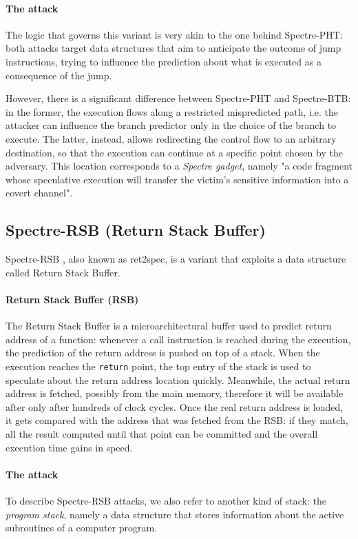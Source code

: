 \documentclass[12pt,a4paper]{book}
\theoremstyle{definition}
\begin{document}
	\paragraph{The attack} The logic that governs this variant is very akin to the one behind Spectre-PHT: both attacks target data structures that aim to anticipate the outcome of jump instructions, trying to influence the prediction about what is executed as a consequence of the jump.
	
	However, there is a significant difference between Spectre-PHT and Spectre-BTB: in the former, the execution flows along a restricted mispredicted path, i.e. the attacker can influence the branch predictor only in the choice of the branch to execute. The latter, instead, allows redirecting the control flow to an arbitrary destination, so that the execution can continue at a specific point chosen by the adversary. This location corresponds to a \textit{Spectre gadget}, namely "a code fragment whose speculative execution will transfer the victim’s sensitive information into a covert channel"\cite{Kocher2019}.
	
	\subsection{Spectre-RSB (Return Stack Buffer)}\label{sec:spectre-rsb}
	Spectre-RSB \cite{Maisuradze2018} \cite{Koruyeh2018} \cite{Canella2019}, also known as ret2spec, is a variant that exploits a data structure called Return Stack Buffer.
	
	\paragraph{Return Stack Buffer (RSB)}The Return Stack Buffer is a microarchitectural buffer used to predict return address of a function: whenever a call instruction is reached during the execution, the prediction of the return address is pushed on top of a stack. When the execution reaches the \texttt{return} point, the top entry of the stack is used to speculate about the return address location quickly. Meanwhile, the actual return address is fetched, possibly from the main memory, therefore it will be available after only after hundreds of clock cycles. Once the real return address is loaded, it gets compared with the address that was fetched from the RSB: if they match, all the result computed until that point can be committed and the overall execution time gains in speed.
	
	\paragraph{The attack} To describe Spectre-RSB attacks, we also refer to another kind of stack: the \textit{program stack}, namely a data structure that stores information about the active subroutines of a computer program.
	
\end{document}
